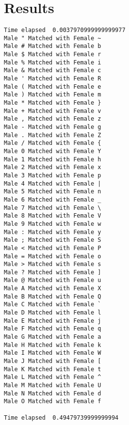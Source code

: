 \documentclass{article}
\begin{document}
\section{Results}
\begin{verbatim}
Time elapsed  0.0037970999999999977
Male " Matched with Female ~
Male # Matched with Female b
Male $ Matched with Female r
Male % Matched with Female i
Male & Matched with Female c
Male ' Matched with Female R
Male ( Matched with Female e
Male ) Matched with Female m
Male * Matched with Female }
Male + Matched with Female v
Male , Matched with Female z
Male - Matched with Female g
Male . Matched with Female Z
Male / Matched with Female {
Male 0 Matched with Female Y
Male 1 Matched with Female h
Male 2 Matched with Female x
Male 3 Matched with Female p
Male 4 Matched with Female |
Male 5 Matched with Female n
Male 6 Matched with Female _
Male 7 Matched with Female \
Male 8 Matched with Female V
Male 9 Matched with Female w
Male : Matched with Female y
Male ; Matched with Female S
Male < Matched with Female P
Male = Matched with Female o
Male > Matched with Female s
Male ? Matched with Female ]
Male @ Matched with Female u
Male A Matched with Female X
Male B Matched with Female Q
Male C Matched with Female `
Male D Matched with Female l
Male E Matched with Female j
Male F Matched with Female q
Male G Matched with Female a
Male H Matched with Female k
Male I Matched with Female W
Male J Matched with Female [
Male K Matched with Female t
Male L Matched with Female ^
Male M Matched with Female U
Male N Matched with Female d
Male O Matched with Female f

Time elapsed  0.49479739999999994


\end{verbatim}
\end{document}
